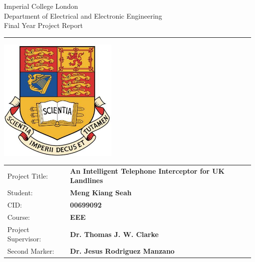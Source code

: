 \documentclass[12pt,a4paper]{report}
\begin{document}
\begin{titlepage}
                \setlength{\parindent}{0pt}
                \setlength{\parskip}{0pt}

                {
                                \Large
                                \raggedright
                                Imperial College London\\[17pt]
                                Department of Electrical and Electronic Engineering\\[17pt]
                                Final Year Project Report\\[17pt]

                }

                \rule{\columnwidth}{3pt}
                \vfill
                \centering
                  \includegraphics[width=0.7\columnwidth,height=60mm,keepaspectratio]{icl.jpg}
                \vfill
                \setlength{\tabcolsep}{0pt}

                \begin{tabular}{p{40mm}p{\dimexpr\columnwidth-40mm}}
                                Project Title: & \textbf{An Intelligent Telephone Interceptor for UK Landlines
} \\[12pt]
                                Student: & \textbf{Meng Kiang Seah} \\[12pt]
                                CID: & \textbf{00699092} \\[12pt]
                                Course: & \textbf{EEE} \\[12pt]
                                Project Supervisor: & \textbf{Dr. Thomas J. W. Clarke} \\[12pt]
                                Second Marker: & \textbf{Dr. Jesus Rodriguez Manzano} \\
                \end{tabular}
\end{titlepage}
\end{document}
